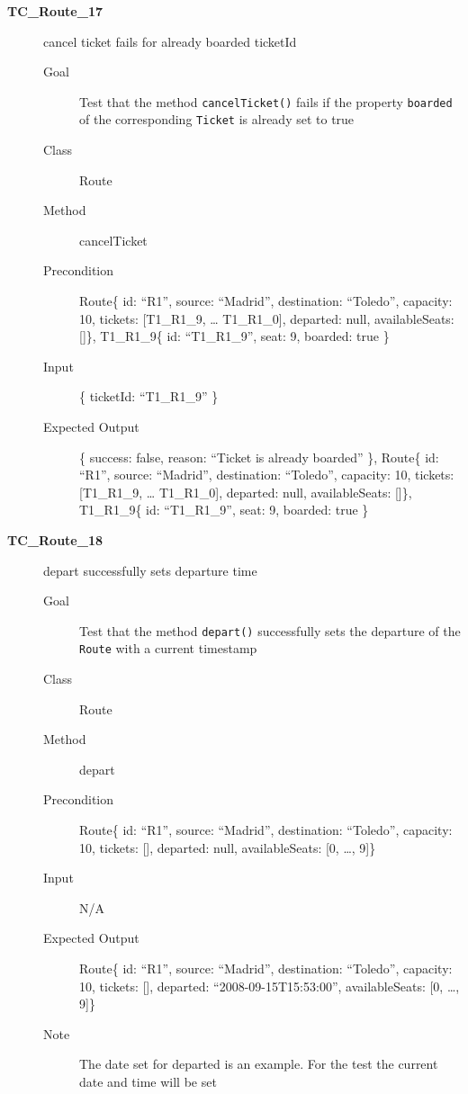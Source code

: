 \documentclass[11pt]{article}
\begin{document}
\begin{description}
\item[{\textbf{TC\_Route\_17}}] cancel ticket fails for already boarded ticketId
\begin{description}
\item[{Goal}] Test that the method \texttt{cancelTicket()} fails if the property \texttt{boarded} of the corresponding \texttt{Ticket} is already set to true
\item[{Class}] Route
\item[{Method}] cancelTicket
\item[{Precondition}] Route\{ id: “R1”, source: “Madrid”, destination: “Toledo”, capacity: 10,  tickets: [T1\_R1\_9, … T1\_R1\_0], departed: null, availableSeats: []\}, T1\_R1\_9\{ id: “T1\_R1\_9”, seat: 9, boarded: true \}
\item[{Input}] \{ ticketId: “T1\_R1\_9” \}
\item[{Expected Output}] \{ success: false, reason: “Ticket is already boarded” \},
Route\{ id: “R1”, source: “Madrid”, destination: “Toledo”, capacity: 10,  tickets: [T1\_R1\_9, … T1\_R1\_0], departed: null, availableSeats: []\}, T1\_R1\_9\{ id: “T1\_R1\_9”, seat: 9, boarded: true \}
\end{description}

\item[{\textbf{TC\_Route\_18}}] depart successfully sets departure time
\begin{description}
\item[{Goal}] Test that the method \texttt{depart()} successfully sets the departure of the \texttt{Route} with a current timestamp
\item[{Class}] Route
\item[{Method}] depart
\item[{Precondition}] Route\{ id: “R1”, source: “Madrid”, destination: “Toledo”, capacity: 10,  tickets: [], departed: null, availableSeats: [0, …, 9]\}
\item[{Input}] N/A
\item[{Expected Output}] Route\{ id: “R1”, source: “Madrid”, destination: “Toledo”, capacity: 10,  tickets: [], departed: “2008-09-15T15:53:00”, availableSeats: [0, …, 9]\}
\item[{Note}] The date set for departed is an example. For the test the current date and time will be set
\end{description}


\end{description}
\end{document}
